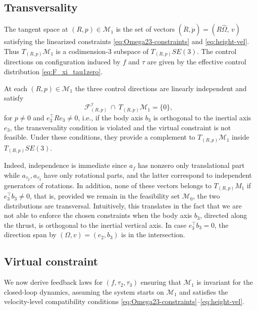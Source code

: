 \documentclass[letterpaper, 10 pt, conference]{ieeeconf}
\begin{document}
\subsection{Transversality}

The tangent space at $(R,p)\in\mathcal{M}_1$ is the set of vectors $(\dot{R},\dot{p})=(R\widehat\Omega,\,v)$ satisfying the linearized constraints \eqref{eq:Omega23-constraints} and \eqref{eq:height-vel}. Thus $T_{(R,p)}\mathcal{M}_1$ is a codimension-$3$ subspace of $T_{(R,p)}SE(3)$. The control directions on configuration induced by $f$ and $\tau$ are given by the effective control distribution \eqref{eq:F_xi_tau1zero}.

At each $(R,p)\in\mathcal{M}_1$ the three control directions are linearly independent and satisfy
\[
\mathcal{F}_{(R,p)}^{\mathcal I}\ \cap\ T_{(R,p)}\mathcal{M}_1=\{0\},
\]
for $p\neq 0$ and $e_3^\top R e_3 \neq 0$, i.e., if the body axis $b_{3}$ is orthogonal to the inertial axis $e_{3}$, the transversality condition is violated and the virtual constraint is not feasible. Under these conditions, they provide a complement to $T_{(R,p)}\mathcal{M}_1$ inside $T_{(R,p)}SE(3)$.

Indeed, independence is immediate since $a_f$ has nonzero only translational part while $a_{\tau_{2}},a_{\tau_{3}}$ have only rotational parts, and the latter correspond to independent generators of rotations. In addition, none of these vectors belongs to \(T_{(R,p)}M_1\) if $e_{3}^\top b_{3} \neq 0$, that is, provided we remain in the feasibility set $\mathcal{M}_{0}$, the two distributions are transversal. Intuitively, this translates in the fact that we are not able to enforce the chosen constraints when the body axis $b_{3}$, directed along the thrust, is orthogonal to the inertial vertical axis. In case $e_{3}^\top b_{3} = 0$, the direction span by $(\Omega, v)=(e_{2}, b_{3})$ is in the intersection. %

\subsection{Virtual constraint}

We now derive feedback laws for $(f,\tau_2,\tau_3)$ ensuring that $\mathcal{M}_1$ is invariant for the closed-loop dynamics, assuming the system starts on $\mathcal{M}_1$ and satisfies the velocity-level compatibility conditions \eqref{eq:Omega23-constraints}--\eqref{eq:height-vel}.
\end{document}

